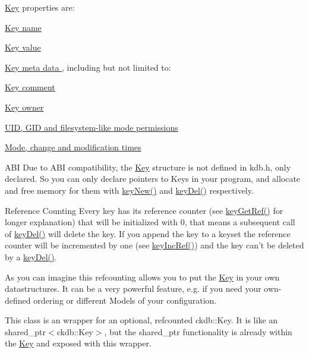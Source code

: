 \hyperlink{classkdb_1_1Key}{Key} properties are\+:
\begin{DoxyItemize}
\item \hyperlink{group__keyname}{Key name }
\item \hyperlink{group__keyvalue}{Key value }
\item \hyperlink{group__keymeta}{Key meta data }, including but not limited to\+:
\begin{DoxyItemize}
\item \hyperlink{group__meta_gafb89735689929ff717cc9f2d0d0b46a2}{Key comment }
\item \hyperlink{owner_8c_a35922a017bee8b4bcb493bbdfad9d6f5}{Key owner }
\item \hyperlink{group__keymeta}{U\+I\+D, G\+I\+D and filesystem-\/like mode permissions }
\item \hyperlink{group__keymeta}{Mode, change and modification times }
\end{DoxyItemize}
\end{DoxyItemize}

\begin{DoxyParagraph}{A\+B\+I}
Due to A\+B\+I compatibility, the {\ttfamily \hyperlink{classkdb_1_1Key}{Key}} structure is not defined in kdb.\+h, only declared. So you can only declare {\ttfamily pointers} to {\ttfamily Keys} in your program, and allocate and free memory for them with \hyperlink{group__key_gad23c65b44bf48d773759e1f9a4d43b89}{key\+New()} and \hyperlink{group__key_ga3df95bbc2494e3e6703ece5639be5bb1}{key\+Del()} respectively.
\end{DoxyParagraph}
\begin{DoxyParagraph}{Reference Counting}
Every key has its reference counter (see \hyperlink{group__key_ga4aabc4272506dd63161db2bbb42de8ae}{key\+Get\+Ref()} for longer explanation) that will be initialized with 0, that means a subsequent call of \hyperlink{group__key_ga3df95bbc2494e3e6703ece5639be5bb1}{key\+Del()} will delete the key. If you append the key to a keyset the reference counter will be incremented by one (see \hyperlink{group__key_ga6970a6f254d67af7e39f8e469bb162f1}{key\+Inc\+Ref()}) and the key can't be deleted by a \hyperlink{group__key_ga3df95bbc2494e3e6703ece5639be5bb1}{key\+Del()}.
\end{DoxyParagraph}
\begin{DoxyParagraph}{}
As you can imagine this refcounting allows you to put the \hyperlink{classkdb_1_1Key}{Key} in your own datastructures. It can be a very powerful feature, e.\+g. if you need your own-\/defined ordering or different Models of your configuration.
\end{DoxyParagraph}
This class is an wrapper for an optional, refcounted ckdb\+::\+Key. It is like an shared\+\_\+ptr$<$ckdb\+::\+Key$>$, but the shared\+\_\+ptr functionality is already within the \hyperlink{classkdb_1_1Key}{Key} and exposed with this wrapper.


